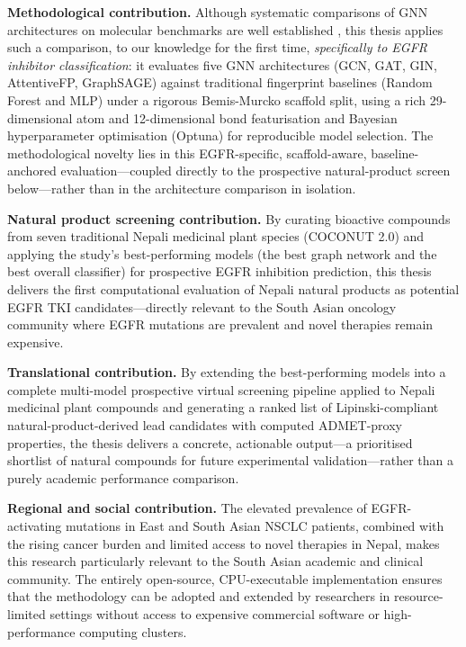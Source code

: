 \textbf{Methodological contribution.} Although systematic comparisons of GNN
architectures on molecular benchmarks are well established
\parencite{jiang2021gnn}, this thesis applies such a comparison, to our knowledge for
the first time, \emph{specifically to EGFR inhibitor classification}: it evaluates
five GNN architectures (GCN, GAT, GIN, AttentiveFP, GraphSAGE) against traditional
fingerprint baselines (Random Forest and MLP) under a rigorous Bemis-Murcko scaffold
split, using a rich 29-dimensional atom and 12-dimensional bond featurisation and
Bayesian hyperparameter optimisation (Optuna) for reproducible model selection. The
methodological novelty lies in this EGFR-specific, scaffold-aware, baseline-anchored
evaluation---coupled directly to the prospective natural-product screen below---rather
than in the architecture comparison in isolation.

\textbf{Natural product screening contribution.} By curating bioactive compounds
from seven traditional Nepali medicinal plant species (COCONUT 2.0) and applying the
study's best-performing models (the best graph network and the best overall
classifier) for prospective EGFR inhibition prediction, this thesis delivers the
first computational evaluation of Nepali natural products as potential EGFR TKI
candidates---directly relevant to the South Asian oncology community where EGFR
mutations are prevalent and novel therapies remain expensive.

\textbf{Translational contribution.} By extending the best-performing models into a
complete multi-model prospective virtual screening pipeline applied to
Nepali medicinal plant compounds and generating a ranked list of
Lipinski-compliant natural-product-derived
lead candidates with computed ADMET-proxy properties, the thesis delivers a concrete,
actionable output---a prioritised shortlist of natural compounds for future
experimental validation---rather than a purely academic performance comparison.

\textbf{Regional and social contribution.} The elevated prevalence of EGFR-activating
mutations in East and South Asian NSCLC patients, combined with the rising cancer
burden and limited access to novel therapies in Nepal, makes this research
particularly relevant to the South Asian academic and clinical community. The
entirely open-source, CPU-executable implementation ensures that the methodology
can be adopted and extended by researchers in resource-limited settings without
access to expensive commercial software or high-performance computing clusters.

